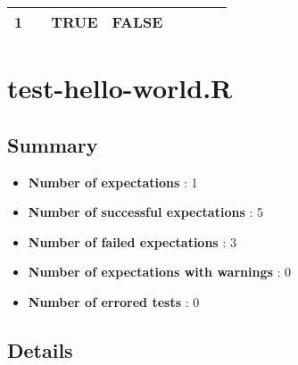 \documentclass[
]{book}
\providecommand{\tightlist}{%
  \setlength{\itemsep}{0pt}\setlength{\parskip}{0pt}}
\begin{document}
\begin{longtable}[]{@{}lllrrllr@{}}
\begin{minipage}[t]{0.11\columnwidth}
1\strut
\end{minipage} & \begin{minipage}[t]{0.05\columnwidth}\raggedleft
0\strut
\end{minipage} & \begin{minipage}[t]{0.08\columnwidth}\raggedright
TRUE\strut
\end{minipage} & \begin{minipage}[t]{0.05\columnwidth}\raggedright
FALSE\strut
\end{minipage} & \begin{minipage}[t]{0.07\columnwidth}\raggedleft
0.052\strut
\end{minipage}\tabularnewline
\bottomrule
\end{longtable}

\hypertarget{test-hello-world.r}{%
\chapter{test-hello-world.R}\label{test-hello-world.r}}

\hypertarget{summary}{%
\section*{Summary}\label{summary}}

\begin{itemize}
\tightlist
\item
  \textbf{Number of expectations} : 1
\item
  \textbf{Number of successful expectations} : 5
\item
  \textbf{Number of failed expectations} : 3
\item
  \textbf{Number of expectations with warnings} : 0
\item
  \textbf{Number of errored tests} : 0
\end{itemize}

\hypertarget{details}{%
\section*{Details}\label{details}}
\end{document}
